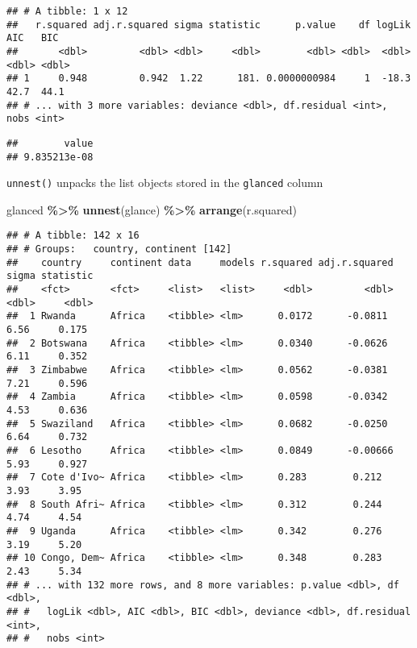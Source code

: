\documentclass[
]{book}
\newenvironment{Shaded}{\begin{snugshade}}{\end{snugshade}}
\newcommand{\CommentTok}[1]{\textcolor[rgb]{0.56,0.35,0.01}{\textit{#1}}}
\newcommand{\DecValTok}[1]{\textcolor[rgb]{0.00,0.00,0.81}{#1}}
\newcommand{\KeywordTok}[1]{\textcolor[rgb]{0.13,0.29,0.53}{\textbf{#1}}}
\newcommand{\NormalTok}[1]{#1}
\newcommand{\OperatorTok}[1]{\textcolor[rgb]{0.81,0.36,0.00}{\textbf{#1}}}
\newcommand{\StringTok}[1]{\textcolor[rgb]{0.31,0.60,0.02}{#1}}
\begin{document}
\begin{verbatim}
## # A tibble: 1 x 12
##   r.squared adj.r.squared sigma statistic      p.value    df logLik   AIC   BIC
##       <dbl>         <dbl> <dbl>     <dbl>        <dbl> <dbl>  <dbl> <dbl> <dbl>
## 1     0.948         0.942  1.22      181. 0.0000000984     1  -18.3  42.7  44.1
## # ... with 3 more variables: deviance <dbl>, df.residual <int>, nobs <int>
\end{verbatim}

\begin{Shaded}
\end{Shaded}

\begin{verbatim}
##        value 
## 9.835213e-08
\end{verbatim}

\texttt{unnest()} unpacks the list objects stored in the \texttt{glanced} column

\begin{Shaded}
\begin{Highlighting}[]
\NormalTok{glanced }\OperatorTok{\%\textgreater{}\%}
\StringTok{  }\KeywordTok{unnest}\NormalTok{(glance) }\OperatorTok{\%\textgreater{}\%}
\StringTok{  }\KeywordTok{arrange}\NormalTok{(r.squared)}
\end{Highlighting}
\end{Shaded}

\begin{verbatim}
## # A tibble: 142 x 16
## # Groups:   country, continent [142]
##    country     continent data     models r.squared adj.r.squared sigma statistic
##    <fct>       <fct>     <list>   <list>     <dbl>         <dbl> <dbl>     <dbl>
##  1 Rwanda      Africa    <tibble> <lm>      0.0172      -0.0811   6.56     0.175
##  2 Botswana    Africa    <tibble> <lm>      0.0340      -0.0626   6.11     0.352
##  3 Zimbabwe    Africa    <tibble> <lm>      0.0562      -0.0381   7.21     0.596
##  4 Zambia      Africa    <tibble> <lm>      0.0598      -0.0342   4.53     0.636
##  5 Swaziland   Africa    <tibble> <lm>      0.0682      -0.0250   6.64     0.732
##  6 Lesotho     Africa    <tibble> <lm>      0.0849      -0.00666  5.93     0.927
##  7 Cote d'Ivo~ Africa    <tibble> <lm>      0.283        0.212    3.93     3.95 
##  8 South Afri~ Africa    <tibble> <lm>      0.312        0.244    4.74     4.54 
##  9 Uganda      Africa    <tibble> <lm>      0.342        0.276    3.19     5.20 
## 10 Congo, Dem~ Africa    <tibble> <lm>      0.348        0.283    2.43     5.34 
## # ... with 132 more rows, and 8 more variables: p.value <dbl>, df <dbl>,
## #   logLik <dbl>, AIC <dbl>, BIC <dbl>, deviance <dbl>, df.residual <int>,
## #   nobs <int>
\end{verbatim}
\end{document}
